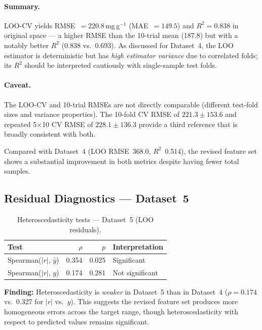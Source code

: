 \documentclass[12pt,a4paper]{article}
\begin{document}
\paragraph{Summary.}
LOO-CV yields RMSE~$= 220.8$\,mg\,g$^{-1}$ (MAE~$= 149.5$) and $R^2 = 0.838$ in
original space — a higher RMSE than the 10-trial mean (187.8) but
with a notably better $R^2$ (0.838 vs.\ 0.693).  As discussed for
Dataset~4, the LOO estimator is deterministic but has \emph{high
estimator variance} due to correlated folds; its $R^2$ should be
interpreted cautiously with single-sample test folds.

\paragraph{Caveat.}
The LOO-CV and 10-trial RMSEs are not directly comparable (different
test-fold sizes and variance properties).  The 10-fold CV RMSE of
$221.3 \pm 153.6$ and repeated 5$\times$10 CV RMSE of
$228.1 \pm 136.3$ provide a third reference that is broadly consistent
with both.

Compared with Dataset~4 (LOO RMSE~368.0, $R^2$~0.514), the revised
feature set shows a substantial improvement in both metrics despite
having fewer total samples.

\subsection{Residual Diagnostics — Dataset~5}
\label{sec:ds5_residual_diagnostics}

\begin{table}[h]
\centering
\caption{Heteroscedasticity tests — Dataset~5 (LOO residuals).}
\label{tab:ds5_hetero}
\begin{tabular}{lrrl}
\toprule
Test & $\rho$ & $p$ & Interpretation \\
\midrule
Spearman($|r|$, $\hat{y}$) & 0.354 & 0.025 & Significant \\
Spearman($|r|$, $y$)       & 0.174 & 0.281 & Not significant \\
\bottomrule
\end{tabular}
\end{table}

\noindent\textbf{Finding:}  Heteroscedasticity is \emph{weaker} in
Dataset~5 than in Dataset~4 ($\rho = 0.174$ vs.\ 0.327 for $|r|$ vs.\
$y$).  This suggests the revised feature set produces more homogeneous
errors across the target range, though heteroscedasticity with respect
to predicted values remains significant.
\end{document}
